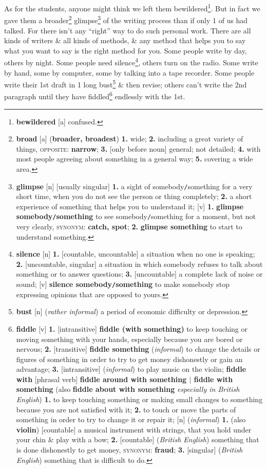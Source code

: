 \documentclass[oneside]{book}
\numberwithin{equation}{section}
\begin{document}
As for the students, anyone might think we left them bewildered\footnote{\textbf{bewildered} [a] confused.}. But in fact we gave them a broader\footnote{\textbf{broad} [a] (\textbf{broader, broadest}) \textbf{1.} wide; \textbf{2.} including a great variety of things, \textsc{opposite}: \textbf{narrow}; \textbf{3.} [only before noun] general; not detailed; \textbf{4.} with most people agreeing about something in a general way; \textbf{5.} covering a wide area.} glimpse\footnote{\textbf{glimpse} [n] [usually singular] \textbf{1.} a sight of somebody\texttt{/}something for a very short time, when you do not see the person or thing completely; \textbf{2.} a short experience of something that helps you to understand it; [v] \textbf{1.} \textbf{glimpse somebody\texttt{/}something} to see somebody\texttt{/}something for a moment, but not very clearly, \textsc{synonym}: \textbf{catch, spot}; \textbf{2.} \textbf{glimpse something} to start to understand something.} of the writing process than if only 1 of us had talked. For there isn't any ``right'' way to do such personal work. There are all kinds of writers \& all kinds of methods, \& any method that helps you to say what you want to say is the right method for you. Some people write by day, others by night. Some people need silence\footnote{\textbf{silence} [n] \textbf{1.} [countable, uncountable] a situation when no one is speaking; \textbf{2.} [uncountable, singular] a situation in which somebody refuses to talk about something or to answer questions; \textbf{3.} [uncountable] a complete lack of noise or sound; [v] \textbf{silence somebody\texttt{/}something} to make somebody stop expressing opinions that are opposed to yours.}, others turn on the radio. Some write by hand, some by computer, some by talking into a tape recorder. Some people write their 1st draft in 1 long bust\footnote{\textbf{bust} [n] (\textit{rather informal}) a period of economic difficulty or depression.} \& then revise; others can't write the 2nd paragraph until they have fiddled\footnote{\textbf{fiddle} [v] \textbf{1.} [intransitive] \textbf{fiddle (with something)} to keep touching or moving something with your hands, especially because you are bored or nervous; \textbf{2.} [transitive] \textbf{fiddle something} (\textit{informal}) to change the details or figures of something in order to try to get money dishonestly or gain an advantage; \textbf{3.} [intransitive] (\textit{informal}) to play music on the violin; \textbf{fiddle with} [phrasal verb] \textbf{fiddle around with something $|$ fiddle with something} (also \textbf{fiddle about with something} \textit{especially in British English}) \textbf{1.} to keep touching something or making small changes to something because you are not satisfied with it; \textbf{2.} to touch or move the parts of something in order to try to change it or repair it; [n] (\textit{informal}) \textbf{1.} (also \textbf{violin}) [countable] a musical instrument with strings, that you hold under your chin \& play with a bow; \textbf{2.} [countable] (\textit{British English}) something that is done dishonestly to get money, \textsc{synonym}: \textbf{fraud}; \textbf{3.} [singular] (\textit{British English}) something that is difficult to do.} endlessly with the 1st.
\end{document}
